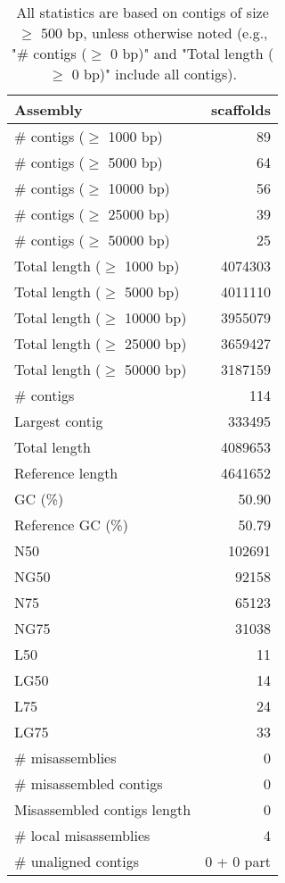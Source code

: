 \documentclass[12pt,a4paper]{article}
\begin{document}
\begin{table}[ht]
\begin{center}
\caption{All statistics are based on contigs of size $\geq$ 500 bp, unless otherwise noted (e.g., "\# contigs ($\geq$ 0 bp)" and "Total length ($\geq$ 0 bp)" include all contigs).}
\begin{tabular}{|l*{1}{|r}|}
\hline
Assembly & scaffolds \\ \hline
\# contigs ($\geq$ 1000 bp) & 89 \\ \hline
\# contigs ($\geq$ 5000 bp) & 64 \\ \hline
\# contigs ($\geq$ 10000 bp) & 56 \\ \hline
\# contigs ($\geq$ 25000 bp) & 39 \\ \hline
\# contigs ($\geq$ 50000 bp) & 25 \\ \hline
Total length ($\geq$ 1000 bp) & 4074303 \\ \hline
Total length ($\geq$ 5000 bp) & 4011110 \\ \hline
Total length ($\geq$ 10000 bp) & 3955079 \\ \hline
Total length ($\geq$ 25000 bp) & 3659427 \\ \hline
Total length ($\geq$ 50000 bp) & 3187159 \\ \hline
\# contigs & 114 \\ \hline
Largest contig & 333495 \\ \hline
Total length & 4089653 \\ \hline
Reference length & 4641652 \\ \hline
GC (\%) & 50.90 \\ \hline
Reference GC (\%) & 50.79 \\ \hline
N50 & 102691 \\ \hline
NG50 & 92158 \\ \hline
N75 & 65123 \\ \hline
NG75 & 31038 \\ \hline
L50 & 11 \\ \hline
LG50 & 14 \\ \hline
L75 & 24 \\ \hline
LG75 & 33 \\ \hline
\# misassemblies & 0 \\ \hline
\# misassembled contigs & 0 \\ \hline
Misassembled contigs length & 0 \\ \hline
\# local misassemblies & 4 \\ \hline
\# unaligned contigs & 0 + 0 part \\ \hline

\end{tabular}
\end{center}
\end{table}
\end{document}
